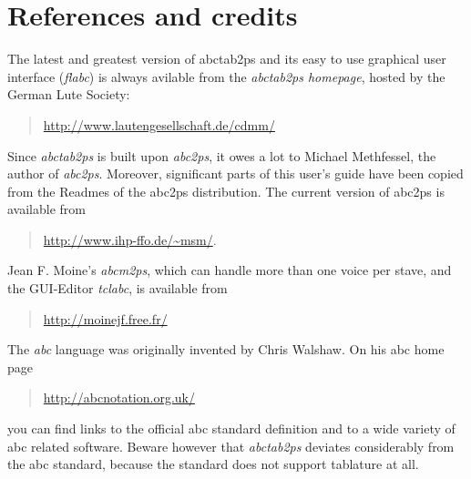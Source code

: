 \documentclass[a4paper]{article}
\begin{document}
\section{References and credits}
The latest and greatest version of abctab2ps and its easy to use graphical
user interface ({\em flabc}) is always
avilable from the {\it abctab2ps homepage}, hosted by the German
Lute Society:
\begin{quote}
\href{http://www.lautengesellschaft.de/cdmm/}{http://www.lautengesellschaft.de/cdmm/}
\end{quote}
\par
{}
Since {\it abctab2ps} is built upon {\it abc2ps}, it owes a lot to
Michael Methfessel, the author of {\it abc2ps}. Moreover, significant
parts of this user's guide have been copied from the Readmes of the
abc2ps distribution. The current version of abc2ps is available from
\begin{quote}
\href{http://www.ihp-ffo.de/\~{}msm/}{http://www.ihp-ffo.de/\~{}msm/}.
\end{quote}
\par
{}
Jean F. Moine's {\it abcm2ps}, which can handle more than one
voice per stave, and the GUI-Editor {\it tclabc}, is available from
\begin{quote}
\href{http://moinejf.free.fr/}{http://moinejf.free.fr/}
\end{quote}
\par
{}
The {\it abc} language was originally invented by Chris Walshaw.
On his abc home page
\begin{quote}
\href{http://abcnotation.org.uk/}{http://abcnotation.org.uk/}
\end{quote}
you can find links to the official abc standard definition and to a 
wide variety of abc related software. Beware however that {\it abctab2ps}
deviates considerably from the abc standard, because the standard
does not support tablature at all.

\printindex
\end{document}
